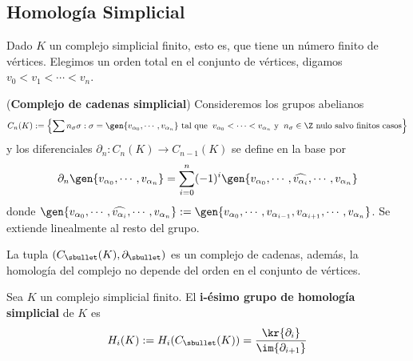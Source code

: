 \documentclass{article}
\begin{document}
\newpage
\subsection{Homología Simplicial}
\noindent Dado $K$ un complejo simplicial finito, esto es, que tiene un número finito de vértices. 
Elegimos un orden total en el conjunto de vértices, digamos $v_{0}<v_{1}<\cdots<v_{n}$.

\vspace{2mm}
\begin{dfn}
    (\textbf{Complejo de cadenas simplicial}) Consideremos los grupos abelianos
    \begin{equation*}
        C_{n}(K):=\left\{\sum n_{\sigma}\sigma:\sigma=\gen{v_{\alpha_{0}},\cdots,v_{\alpha_{n}}}
        \text{ tal que}\hspace{2mm}v_{\alpha_{0}}<\cdots<v_{\alpha_{n}}
        \text{ y}\hspace{2mm}n_{\sigma}\in\Z
        \text{ nulo salvo finitos casos}\right\}
    \end{equation*}
    y los diferenciales $\partial_{n}:C_{n}(K)\to C_{n-1}(K)$ se define en la base por
    \begin{equation*}
        \partial_{n}\gen{v_{\alpha_{0}},\cdots,v_{\alpha_{n}}}
        =\sum_{i=0}^{n}(-1)^{i}\gen{v_{\alpha_{0}},\cdots,\widehat{v_{\alpha_{i}}},
        \cdots,v_{\alpha_{n}}}
    \end{equation*}
    donde $\gen{v_{\alpha_{0}},\cdots,\widehat{v_{\alpha_{i}}},\cdots,v_{\alpha_{n}}}:=
    \gen{v_{\alpha_{0}},\cdots,v_{\alpha_{i-1}},v_{\alpha_{i+1}},\cdots,v_{\alpha_{n}}}$. Se 
    extiende linealmente al resto del grupo.
\end{dfn}

\vspace{2mm}
\begin{teo}
    La tupla $(C_{\sbullet}(K),\partial_{\sbullet})$ es un complejo de cadenas, además, la 
    homología del complejo no depende del orden en el conjunto de vértices.
\end{teo}

\vspace{2mm}
\begin{dfn}
    Sea $K$ un complejo simplicial finito. El \textbf{i-ésimo grupo de homología simplicial} de 
    $K$ es
    \begin{equation*}
        H_{i}(K):=H_{i}(C_{\sbullet}(K))=\frac{\kr{\partial_{i}}}{\im{\partial_{i+1}}}
    \end{equation*}
\end{dfn}
\end{document}
